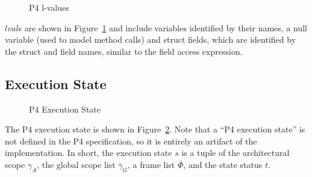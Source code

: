 \documentclass[UTF8]{article}
\begin{document}
\begin{figure}[h!]
\centering\ottgrammartabular{
\ottlval\ottafterlastrule
}
\caption{P4 l-values}
\label{fig:lval}
\end{figure}

$lval$s are shown in Figure~\ref{fig:lval} and include variables identified by their names, a null variable (used to model method calls) and struct fields, which are identified by the struct and field names, similar to the field access expression.

\newpage
\newcommand{\exstate}{\ensuremath{s}}
\newcommand{\ascope}{\ensuremath{{\gamma}_A}}
\newcommand{\currsf}{\ensuremath{\varepsilon}}
\newcommand{\gscope}{\ensuremath{{\gamma}_G}}
\newcommand{\gscopel}{\ensuremath{\overline{\gamma_G}}}
\newcommand{\escope}{\ensuremath{{\gamma}_{\emptyset}}}
\newcommand{\cstack}{E}
\newcommand{\status}{\ensuremath{t}}
\newcommand{\running}{\textbf{run}}
\newcommand{\returnst}[1]{\ensuremath{\textbf{ret}\;#1}}
\newcommand{\trans}[1]{\ensuremath{\textbf{tra}\;#1}}
\newcommand{\sterr}{\ensuremath{\bot}}
\newcommand{\pfin}{\ensuremath{p_{\mathrm{fin}}}}
\newcommand{\expr}{\ensuremath{e}}
\newcommand{\varstar}{\mathbf{var} ( \mathbf{star} , \mathit{funn} )}
\newcommand{\scope}{\gamma}
\newcommand{\scopeL}{\overline{\gamma}}
\newcommand{\stmtL}{\overline{stmt}}
\newcommand{\cons}{, ... \, ,}
\newcommand{\concat}{{+}\mspace{-8mu}{+}}
\newcommand{\bitv}{\ensuremath{bitv}}
\newcommand{\estmt}{\emptyset_{ \mathrm{stmt} }}
\newcommand{\frameL}{\overline{\Phi}}
\newcommand{\declL}{\overline{decl}}
\newcommand{\fapp}{\ensuremath{\mathit{table\_apply}}}

\subsection{Execution State}

\begin{figure}[h!]
\centering\ottgrammartabular{
\ottstatus\ottinterrule
\ottstate\ottafterlastrule
}
\caption{P4 Execution State}  %
\label{fig:status}
\end{figure}

The P4 execution state is shown in Figure~\ref{fig:status}. Note that a ``P4 execution state'' is not defined in the P4 specification, so it is entirely an artifact of the \pfott{} implementation. In short, the execution state \exstate{} is a tuple of the architectural scope \ascope{}, the global scope list $\scopeL_G$, a frame list $\frameL$, and the state status \status{}. 
\end{document}
